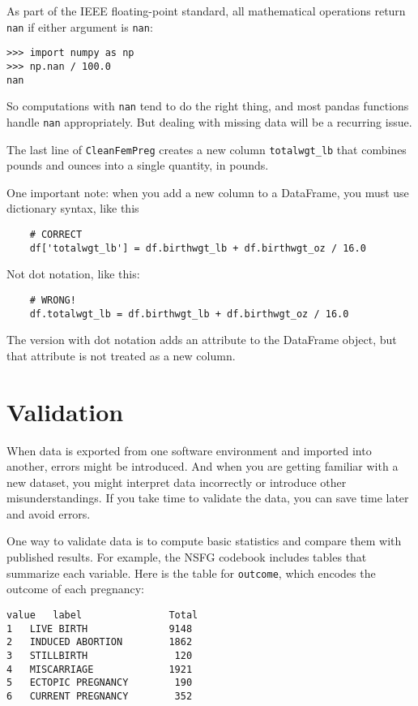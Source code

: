 As part of the IEEE floating-point standard, all mathematical
operations return {\tt nan} if either argument is {\tt nan}:

\begin{verbatim}
>>> import numpy as np
>>> np.nan / 100.0
nan
\end{verbatim}

So computations with {\tt nan} tend to do the right thing, and most
pandas functions handle {\tt nan} appropriately.  But dealing with
missing data will be a recurring issue.

The last line of {\tt CleanFemPreg} creates a new
column \verb"totalwgt_lb" that combines pounds and ounces into
a single quantity, in pounds.

One important note: when you add a new column to a DataFrame, you
must use dictionary syntax, like this

\begin{verbatim}
    # CORRECT
    df['totalwgt_lb'] = df.birthwgt_lb + df.birthwgt_oz / 16.0 
\end{verbatim}

Not dot notation, like this:

\begin{verbatim}
    # WRONG!
    df.totalwgt_lb = df.birthwgt_lb + df.birthwgt_oz / 16.0 
\end{verbatim}

The version with dot notation adds an attribute to the DataFrame
object, but that attribute is not treated as a new column.


\section{Validation}

When data is exported from one software environment and imported into
another, errors might be introduced.  And when you are
getting familiar with a new dataset, you might interpret data
incorrectly or introduce other misunderstandings.  If you take
time to validate the data, you can save time later and avoid errors.

One way to validate data is to compute basic statistics and compare
them with published results.  For example, the NSFG codebook includes
tables that summarize each variable.  Here is the table for
{\tt outcome}, which encodes the outcome of each pregnancy:

\begin{verbatim}
value	label	 	        Total
1	LIVE BIRTH              9148
2	INDUCED ABORTION        1862
3	STILLBIRTH               120
4	MISCARRIAGE             1921
5	ECTOPIC PREGNANCY        190
6	CURRENT PREGNANCY        352
\end{verbatim}

